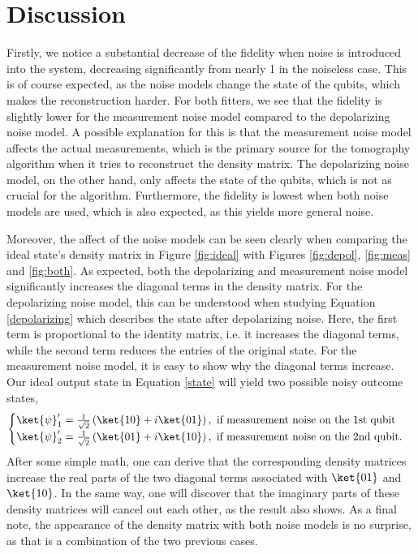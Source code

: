 \documentclass[a4paper,12pt]{article}
\begin{document}
\section{Discussion}
Firstly, we notice a substantial decrease of the fidelity when noise is introduced into the system, decreasing significantly from nearly 1 in the noiseless case. This is of course expected, as the noise models change the state of the qubits, which makes the reconstruction harder. For both fitters, we see that the fidelity is slightly lower for the measurement noise model compared to the depolarizing noise model. A possible explanation for this is that the measurement noise model affects the actual measurements, which is the primary source for the tomography algorithm when it tries to reconstruct the density matrix. The depolarizing noise model, on the other hand, only affects the state of the qubits, which is not as crucial for the algorithm. Furthermore, the fidelity is lowest when both noise models are used, which is also expected, as this yields more general noise. 

Moreover, the affect of the noise models can be seen clearly when comparing the ideal state's density matrix in Figure \ref{fig:ideal} with Figures \ref{fig:depol}, \ref{fig:meas} and \ref{fig:both}. As expected, both the depolarizing and measurement noise model significantly increases the diagonal terms in the density matrix. For the depolarizing noise model, this can be understood when studying Equation \ref{depolarizing} which describes the state after depolarizing noise. Here, the first term is proportional to the identity matrix, i.e. it increases the diagonal terms, while the second term reduces the entries of the original state. For the measurement noise model, it is easy to show why the diagonal terms increase. Our ideal output state in Equation \ref{state} will yield two possible noisy outcome states,
\begin{equation}
    \begin{cases}
        \ket{\psi}_1' = \frac{1}{\sqrt{2}}\left(\ket{10} + i\ket{01}\right), \text{ if measurement noise on the 1st qubit} \\
        \ket{\psi}_2' = \frac{1}{\sqrt{2}}\left(\ket{01} + i\ket{10}\right), \text{ if measurement noise on the 2nd qubit.}
    \end{cases}
\end{equation}
After some simple math, one can derive that the corresponding density matrices increase the real parts of the two diagonal terms associated with $\ket{01}$ and $\ket{10}$. In the same way, one will discover that the imaginary parts of these density matrices will cancel out each other, as the result also shows. As a final note, the appearance of the density matrix with both noise models is no surprise, as that is a combination of the two previous cases.
\end{document}
